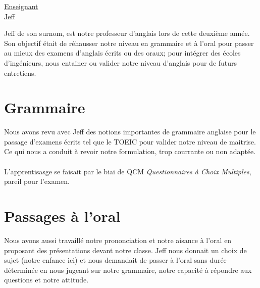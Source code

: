 \renewcommand{\figurename}{}

\vspace*{0.2cm}%
      \large
      \href{}{\color{black}Enseignant\\Jeff}\\%
      \normalsize
\vspace*{0.5cm}%

Jeff de son surnom, est notre professeur d'anglais lors de cette deuxième année. Son objectif était de réhausser notre niveau en grammaire et à l'oral pour passer au mieux des examens d'anglais écrits ou des oraux; pour intégrer des écoles d'ingénieurs, nous entainer ou valider notre niveau d'anglais pour de futurs entretiens. 

\section{Grammaire}

Nous avons revu avec Jeff des notions importantes de grammaire anglaise pour le passage d'examens écrits tel que le TOEIC pour valider notre niveau de maitrise. Ce qui nous a conduit à revoir notre formulation, trop courrante ou non adaptée.
\\ \\
L'apprentisasge se faisait par le biai de QCM \textit{Questionnaires à Choix Multiples}, pareil pour l'examen.

\section{Passages à l'oral}

Nous avons aussi travaillé notre prononciation et notre aisance à l'oral en proposant des présentations devant notre classe. Jeff nous donnait un choix de sujet (notre enfance ici) et nous demandait de passer à l'oral sans durée déterminée en nous jugeant sur notre grammaire, notre capacité à répondre aux questions et notre attitude.